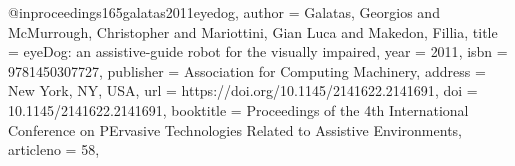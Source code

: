 @inproceedings{165galatas2011eyedog,
author = {Galatas, Georgios and McMurrough, Christopher and Mariottini, Gian Luca and Makedon, Fillia},
title = {eyeDog: an assistive-guide robot for the visually impaired},
year = {2011},
isbn = {9781450307727},
publisher = {Association for Computing Machinery},
address = {New York, NY, USA},
url = {https://doi.org/10.1145/2141622.2141691},
doi = {10.1145/2141622.2141691},
booktitle = {Proceedings of the 4th International Conference on PErvasive Technologies Related to Assistive Environments},
articleno = {58},
}